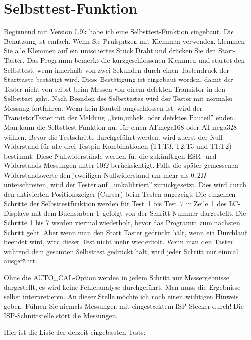 
\section{Selbsttest-Funktion}
\label{sec:selftest}
Beginnend mit Version 0.9k habe ich eine Selbsttest-Funktion eingebaut.
Die Benutzung ist einfach.
Wenn Sie Prüfspitzen mit Klemmen verwenden, klemmen Sie alle Klemmen auf ein unisoliertes Stück Draht und drücken Sie
den Start-Taster.
Das Programm bemerkt die kurzgeschlossenen Klemmen und startet den Selbsttest, wenn innerhalb von
zwei Sekunden durch einen Tastendruck der Starttaste bestätigt wird. Diese Bestätigung ist eingebaut
worden, damit der Tester nicht von selbst beim Messen von einem defekten Transistor in den Selbsttest geht.
Nach Beenden des Selbsttestes wird der Tester mit normaler Messung fortfahren.
Wenn kein Bauteil angeschlossen ist, wird der TransistorTester mit der
Meldung ,,kein,unbek. oder defektes Bauteil'' enden.
Man kann die Selbsttest-Funktion nur für einen ATmega168 oder ATmega328 wählen.
Bevor die Testschritte durchgeführt werden, wird zuerst der Null-Widerstand für alle drei Testpin-Kombinationen
(T1:T3, T2:T3 und T1:T2) bestimmt. Diese Nullwiderstände werden für die zukünftigen ESR- und Widerstands-Messungen
unter \(10 \Omega\) berücksichtigt.
Falls die später gemessenen Widerstandswerte den jeweiligen Nullwiderstand um mehr als \(0,2 \Omega\) unterschreiten,
wird der Tester auf ,,unkalibriert'' zurückgesetzt. 
Dies wird durch den aktivierten Positionszeiger (Cursor)  beim Testen angezeigt.
Die einzelnen Schritte der Selbsttestfunktion werden für Test~1 bis Test~7 in Zeile~1 des LC-Displays mit dem Buchstaben T
gefolgt von der Schritt-Nummer dargestellt.
Die Schritte 1 bis 7 werden viermal wiederholt, bevor das Programm zum nächsten Schritt geht.
Aber wenn man den Start Taster gedrückt hält, wenn ein Durchlauf beendet wird, wird dieser Test nicht
mehr wiederholt.
Wenn man den Taster während dem gesamten Selbsttest gedrückt hält, wird jeder Schritt nur einmal ausgeführt.

Ohne die AUTO\_CAL-Option werden in jedem Schritt nur Messergebnisse dargestellt, es wird keine Fehleranalyse durchgeführt.
Man  muss die Ergebnisse selbst interpretieren.
An dieser Stelle möchte ich noch einen wichtigen Hinweis geben. Führen Sie niemals Messungen mit
eingestecktem ISP-Stecker durch!
Die ISP-Schnittstelle stört die Messungen.

\vspace{1cm}
Hier ist die Liste der derzeit eingebauten Tests:
\vspace{1cm}

